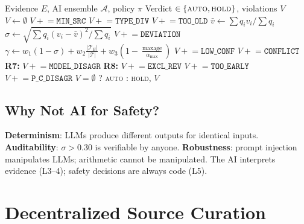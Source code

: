\documentclass[11pt,a4paper,twocolumn]{article}
\begin{document}
\begin{algorithm}[H]
\caption{Policy Evaluation (10 rules)}
\label{alg:policy}
\scriptsize
\begin{algorithmic}[1]
\Require Evidence $E$, AI ensemble $\mathcal{A}$, policy $\pi$
\Ensure Verdict $\in \{\textsc{auto}, \textsc{hold}\}$, violations $V$
\State $V \gets \emptyset$
 $V \mathrel{+}= \texttt{MIN\_SRC}$ \EndIf
{} $V \mathrel{+}= \texttt{TYPE\_DIV}$ \EndIf
{}  $V \mathrel{+}= \texttt{TOO\_OLD}$ \EndIf \EndFor
\State $\bar{v} \gets \sum q_i v_i / \sum q_i$ 
\State $\sigma \gets \sqrt{\sum q_i(v_i - \bar{v})^2 / \sum q_i}$
\If{$\sigma > \delta_{\max}$} $V \mathrel{+}= \texttt{DEVIATION}$ \EndIf
\State $\gamma \gets w_1(1{-}\sigma) + w_2\frac{|\mathcal{T}_E|}{|\mathcal{T}|} + w_3(1 {-} \frac{\max\text{age}}{\alpha_{\max}})$
\If{$\gamma < \gamma_{\min}$} $V \mathrel{+}= \texttt{LOW\_CONF}$ \EndIf
{}  $V \mathrel{+}= \texttt{CONFLICT}$ \EndIf \EndFor
\State \textbf{R7:}  $V \mathrel{+}= \texttt{MODEL\_DISAGR}$ \EndIf
\State \textbf{R8:}  $V \mathrel{+}= \texttt{EXCL\_REV}$ \EndIf
{} $V \mathrel{+}= \texttt{TOO\_EARLY}$ \EndIf
{} $V \mathrel{+}= \texttt{P\_C\_DISAGR}$ \EndIf
\State \Return $V = \emptyset$ ? \textsc{auto} : \textsc{hold}, $V$
\end{algorithmic}
\end{algorithm}

\subsection{Why Not AI for Safety?}

\textbf{Determinism}: LLMs produce different outputs for identical inputs. \textbf{Auditability}: $\sigma > 0.30$ is verifiable by anyone. \textbf{Robustness}: prompt injection manipulates LLMs; arithmetic cannot be manipulated. The AI interprets evidence (L3--4); safety decisions are always code (L5).

\section{Decentralized Source Curation}
\end{document}
